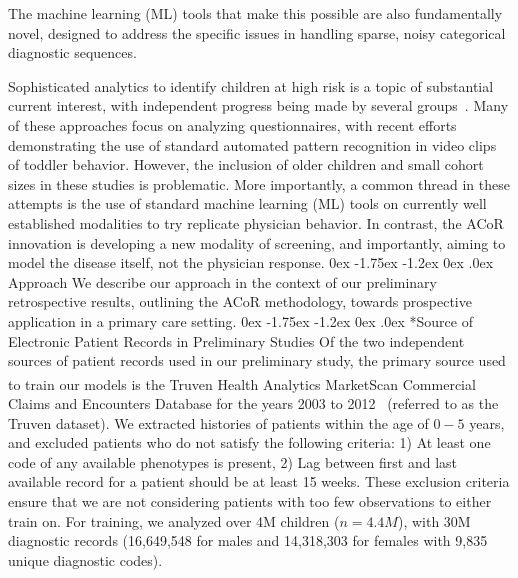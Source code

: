 \documentclass[onecolumn, compsoc,11pt]{IEEEtran}
\makeatletter
\renewcommand\subsection{\@startsection {subsection}{2}{\z@}%
                                   {0ex \@plus -1.75ex \@minus -1.2ex}%
                                   {0ex \@plus.0ex}%
                                   {\fontsize{11}{11}\selectfont\bfseries\sffamily\color{black}}}
\def\ZERO{ACoR\xspace}
\def\acor{ACoR\xspace}
\makeatother
\begin{document}
The machine learning (ML) tools that make this possible are also fundamentally novel, designed to address the specific issues in handling sparse, noisy categorical diagnostic sequences. 


Sophisticated analytics to identify children at high risk is a topic of substantial current interest, with independent progress being made by several groups~\cite{hyde2019applications,abbas2020multi,duda2016clinical,duda2014testing,fusaro2014potential,wall2012use,wall2012use2}. Many of these approaches  focus on analyzing questionnaires, with recent efforts demonstrating the use of  standard automated pattern recognition in video clips of toddler behavior. However, the inclusion of older children and  small cohort sizes in these studies is problematic. More importantly, a common thread in these attempts is the use of standard machine learning (ML) tools on currently well established modalities to try replicate physician behavior. In contrast, the \acor innovation is developing a new modality of screening, and importantly, aiming to model the disease itself,  not the physician response. 
\subsection{Approach}
We describe our approach in the context of our preliminary retrospective results, outlining  the \ZERO methodology, towards prospective  application in a primary care setting. 
\subsection*{Source of Electronic Patient Records in Preliminary Studies}
Of the two independent sources of patient records used in our preliminary study,  the primary source used to train our models  is the Truven Health Analytics  MarketScan\textsuperscript{\textregistered} Commercial Claims and Encounters Database for the years 2003 to 2012~\cite{hansen2017truven} (referred to  as the Truven dataset). 
We extracted histories of patients within the age of $0-5$ years, and excluded  patients who do not satisfy the following criteria: 1) At least one code of any available phenotypes is present, 2) Lag between first and last available record for a patient should be at least 15 weeks. These exclusion criteria ensure that we are not considering patients with too few observations to either train on. For training, we analyzed over 4M children ($n=4.4M$), with 30M diagnostic records (16,649,548 for males and  14,318,303  for females with 9,835 unique diagnostic codes).
\end{document}
